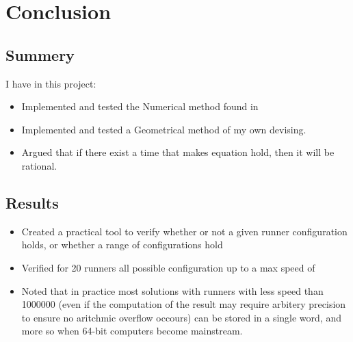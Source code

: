 

\section{Conclusion}
\label{conclusion}

\subsection{Summery}

I have in this project:
\begin{itemize}
\item Implemented and tested the Numerical method found in \cite{invis}
\item Implemented and tested a Geometrical method of my own devising.
\item Argued that if there exist a time that makes equation  hold, then it will be rational.
\end{itemize}

\subsection{Results}
\begin{itemize}
\item Created a practical tool to verify whether or not a given runner configuration holds, or whether a range of configurations hold
\item Verified for 20 runners all possible configuration up to a max speed of \maxNumbers
\item Noted that in practice most solutions with runners with less speed than 1000000 (even if the computation of the result may require arbitery precision to ensure no aritchmic overflow occours) can be stored in a single word, and more so when 64-bit computers become mainstream.
\end{itemize}

